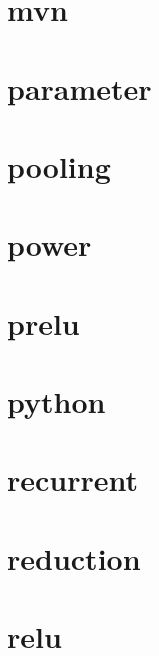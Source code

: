 \documentclass[twoside]{book}
\newcommand{\+}{\discretionary{\mbox{\scriptsize$\hookleftarrow$}}{}{}}
\begin{document}
\chapter{mvn}
\label{md_docs_tutorial_layers_mvn}

\chapter{parameter}
\label{md_docs_tutorial_layers_parameter}

\chapter{pooling}
\label{md_docs_tutorial_layers_pooling}

\chapter{power}
\label{md_docs_tutorial_layers_power}

\chapter{prelu}
\label{md_docs_tutorial_layers_prelu}

\chapter{python}
\label{md_docs_tutorial_layers_python}

\chapter{recurrent}
\label{md_docs_tutorial_layers_recurrent}

\chapter{reduction}
\label{md_docs_tutorial_layers_reduction}

\chapter{relu}
\label{md_docs_tutorial_layers_relu}

\end{document}
